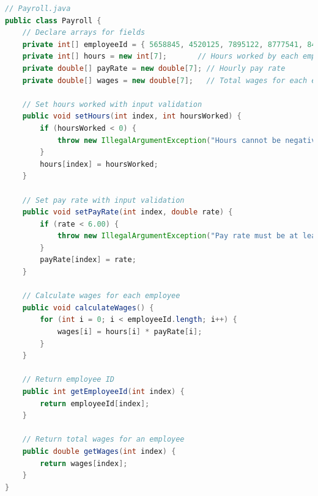 \documentclass{article}
\begin{document}
\begin{lstlisting}[language=Java, caption=Payroll.java]
// Payroll.java
public class Payroll {
    // Declare arrays for fields
    private int[] employeeId = { 5658845, 4520125, 7895122, 8777541, 8451277, 1302850, 7580489 };
    private int[] hours = new int[7];       // Hours worked by each employee
    private double[] payRate = new double[7]; // Hourly pay rate
    private double[] wages = new double[7];   // Total wages for each employee

    // Set hours worked with input validation
    public void setHours(int index, int hoursWorked) {
        if (hoursWorked < 0) {
            throw new IllegalArgumentException("Hours cannot be negative.");
        }
        hours[index] = hoursWorked;
    }

    // Set pay rate with input validation
    public void setPayRate(int index, double rate) {
        if (rate < 6.00) {
            throw new IllegalArgumentException("Pay rate must be at least 6.00.");
        }
        payRate[index] = rate;
    }

    // Calculate wages for each employee
    public void calculateWages() {
        for (int i = 0; i < employeeId.length; i++) {
            wages[i] = hours[i] * payRate[i];
        }
    }

    // Return employee ID
    public int getEmployeeId(int index) {
        return employeeId[index];
    }

    // Return total wages for an employee
    public double getWages(int index) {
        return wages[index];
    }
}
\end{lstlisting}
\end{document}

